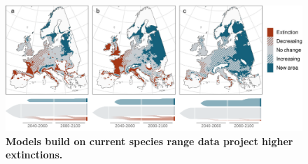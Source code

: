 \documentclass[11pt,letter]{article}
\begin{document}
\begin{figure}
	\centering
	\includegraphics[width=1\linewidth]{../newfigures/files/sankey/fagus_sankey.pdf}
	\caption{\textbf{Models build on current species range data project higher extinctions.}}
	\label{fig:diffproj}
\end{figure}
\end{document}
